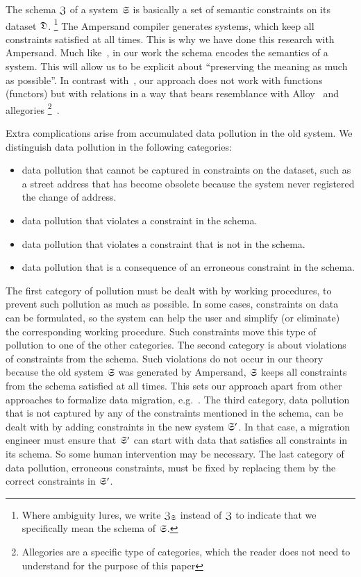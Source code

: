 \documentclass{elsarticle}
\begin{document}
   The schema $\mathfrak{Z}$ of a system $\mathfrak{S}$ is basically a set of semantic constraints on its dataset $\mathfrak{D}$.%
\footnote{Where ambiguity lures, we write $\mathfrak{Z}_{\mathfrak{S}}$ instead of $\mathfrak{Z}$ to indicate that we specifically mean the schema of $\mathfrak{S}$.}
   The Ampersand compiler generates systems, which keep all constraints satisfied at all times.
   This is why we have done this research with Ampersand.
   Much like~\cite{Spivak2012}, in our work the schema encodes the semantics of a system.
   This will allow us to be explicit about ``preserving the meaning as much as possible''.
   In contrast with~\cite{Spivak2012}, our approach does not work with functions (functors)
   but with relations in a way that bears resemblance with Alloy~\cite{Alloy2006} and allegories%
\footnote{Allegories are a specific type of categories, which the reader does not need to understand for the purpose of this paper}~\cite{Zielinski2013}.

   Extra complications arise from accumulated data pollution in the old system.
   We distinguish data pollution in the following categories:
\begin{itemize}
   \item data pollution that cannot be captured in constraints on the dataset,
   such as a street address that has become obsolete because the system never registered the change of address.
   \item data pollution that violates a constraint in the schema.
   \item data pollution that violates a constraint that is not in the schema.
   \item data pollution that is a consequence of an erroneous constraint in the schema.
\end{itemize}
   The first category of pollution must be dealt with by working procedures, to prevent such pollution as much as possible.
   In some cases, constraints on data can be formulated,
   so the system can help the user and simplify (or eliminate) the corresponding working procedure.
   Such constraints move this type of pollution to one of the other categories.
   The second category is about violations of constraints from the schema.
   Such violations do not occur in our theory because the old system $\mathfrak{S}$ was generated by Ampersand,
   $\mathfrak{S}$ keeps all constraints from the schema satisfied at all times.
   This sets our approach apart from other approaches to formalize data migration, e.g.~\cite{Thalheim2013}.
   The third category, data pollution that is not captured by any of the constraints mentioned in the schema,
   can be dealt with by adding constraints in the new system $\mathfrak{S}'$.
   In that case, a migration engineer must ensure that $\mathfrak{S}'$ can start with data that satisfies all constraints in its schema.
   So some human intervention may be necessary.
   The last category of data pollution, erroneous constraints, must be fixed by replacing them by the correct constraints in $\mathfrak{S}'$.
\end{document}
